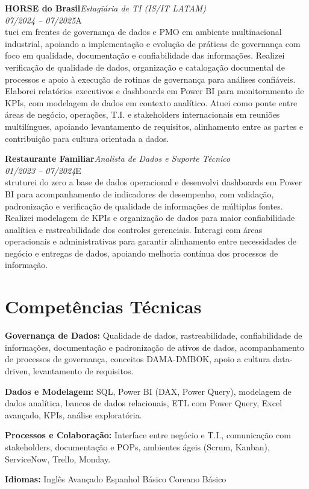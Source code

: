 \documentclass[11pt,a4paper]{article}
\newcommand{\cvrole}[4]{%
  \vspace{4pt}%
  {\bfseries\color{accentcolor}#1}\hfill{\itshape #2}\\[-2pt]%
  {\itshape #3}\hfill #4\\[6pt]%
}
\begin{document}
\cvrole{HORSE do Brasil}{Estagiária de TI (IS/IT LATAM)}{07/2024 -- 07/2025}

Atuei em frentes de governança de dados e PMO em ambiente multinacional industrial, apoiando a implementação e evolução de práticas de governança com foco em qualidade, documentação e confiabilidade das informações. Realizei verificação de qualidade de dados, organização e catalogação documental de processos e apoio à execução de rotinas de governança para análises confiáveis. Elaborei relatórios executivos e dashboards em Power BI para monitoramento de KPIs, com modelagem de dados em contexto analítico. Atuei como ponte entre áreas de negócio, operações, T.I. e stakeholders internacionais em reuniões multilíngues, apoiando levantamento de requisitos, alinhamento entre as partes e contribuição para cultura orientada a dados.

\cvrole{Restaurante Familiar}{Analista de Dados e Suporte Técnico}{01/2023 -- 07/2024}

Estruturei do zero a base de dados operacional e desenvolvi dashboards em Power BI para acompanhamento de indicadores de desempenho, com validação, padronização e verificação de qualidade de informações de múltiplas fontes. Realizei modelagem de KPIs e organização de dados para maior confiabilidade analítica e rastreabilidade dos controles gerenciais. Interagi com áreas operacionais e administrativas para garantir alinhamento entre necessidades de negócio e entregas de dados, apoiando melhoria contínua dos processos de informação.

\section{Competências Técnicas}

\textbf{Governança de Dados:} Qualidade de dados, rastreabilidade, confiabilidade de informações, documentação e padronização de ativos de dados, acompanhamento de processos de governança, conceitos DAMA-DMBOK, apoio a cultura data-driven, levantamento de requisitos.

\textbf{Dados e Modelagem:} SQL, Power BI (DAX, Power Query), modelagem de dados analítica, bancos de dados relacionais, ETL com Power Query, Excel avançado, KPIs, análise exploratória.

\textbf{Processos e Colaboração:} Interface entre negócio e T.I., comunicação com stakeholders, documentação e POPs, ambientes ágeis (Scrum, Kanban), ServiceNow, Trello, Monday.

\textbf{Idiomas:} Inglês Avançado \enspace\textbullet\enspace Espanhol Básico \enspace\textbullet\enspace Coreano Básico
\end{document}
